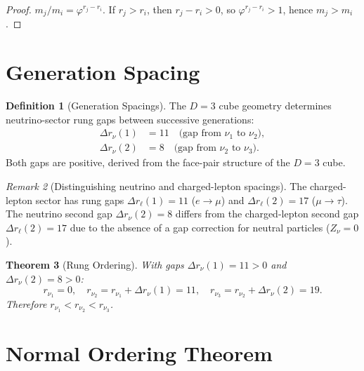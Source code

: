 \documentclass[12pt,a4paper]{article}
\newtheorem{theorem}{Theorem}[section]
\theoremstyle{definition}
\newtheorem{definition}[theorem]{Definition}
\theoremstyle{remark}
\newtheorem{remark}[theorem]{Remark}
\begin{document}
\begin{proof}
$m_j/m_i = \varphi^{r_j - r_i}$.  If $r_j > r_i$, then
$r_j - r_i > 0$, so $\varphi^{r_j - r_i} > 1$, hence
$m_j > m_i$.
\end{proof}

\section{Generation Spacing}
\label{sec:spacing}

\begin{definition}[Generation Spacings]
The $D = 3$ cube geometry determines neutrino-sector
rung gaps between successive generations:
\begin{align}
  \Delta r_\nu(1) &= 11
  \quad\text{(gap from }\nu_1\text{ to }\nu_2\text{)},\\
  \Delta r_\nu(2) &= 8
  \quad\text{(gap from }\nu_2\text{ to }\nu_3\text{)}.
\end{align}
Both gaps are positive, derived from the face-pair
structure of the $D = 3$ cube.
\end{definition}

\begin{remark}[Distinguishing neutrino and charged-lepton spacings]
The charged-lepton sector has rung gaps $\Delta r_\ell(1) = 11$
($e \to \mu$) and $\Delta r_\ell(2) = 17$ ($\mu \to \tau$).
The neutrino second gap $\Delta r_\nu(2) = 8$ differs from the
charged-lepton second gap $\Delta r_\ell(2) = 17$ due to the
absence of a gap correction for neutral particles ($Z_\nu = 0$).
\end{remark}

\begin{theorem}[Rung Ordering]
\label{thm:rung-order}
With gaps $\Delta r_\nu(1) = 11 > 0$ and $\Delta r_\nu(2) = 8 > 0$:
\begin{equation}
  r_{\nu_1} = 0, \quad
  r_{\nu_2} = r_{\nu_1} + \Delta r_\nu(1) = 11, \quad
  r_{\nu_3} = r_{\nu_2} + \Delta r_\nu(2) = 19.
\end{equation}
Therefore $r_{\nu_1} < r_{\nu_2} < r_{\nu_3}$.
\end{theorem}

\section{Normal Ordering Theorem}
\label{sec:normal}
\end{document}
